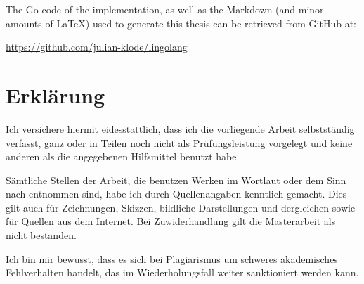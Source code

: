 \vskip1cm
The Go code of the implementation, as well as the Markdown (and minor amounts of \LaTeX) used to generate
this thesis can be retrieved from GitHub at:

\url{https://github.com/julian-klode/lingolang}


\chapter*{Erklärung}
\begin{otherlanguage}{ngerman}
Ich versichere hiermit eidesstattlich, dass ich die vorliegende Arbeit
selbstständig verfasst, ganz oder in Teilen noch nicht als
Prüfungsleistung vorgelegt und keine anderen als die angegebenen
Hilfsmittel benutzt habe.

Sämtliche Stellen der Arbeit, die benutzen Werken im Wortlaut oder dem
Sinn nach entnommen sind, habe ich durch Quellenangaben kenntlich
gemacht. Dies gilt auch für Zeichnungen, Skizzen, bildliche
Darstellungen und dergleichen sowie für Quellen aus dem Internet. Bei
Zuwiderhandlung gilt die Masterarbeit als nicht bestanden.

Ich bin mir bewusst, dass es sich bei Plagiarismus um schweres
akademisches Fehlverhalten handelt, das im Wiederholungsfall weiter
sanktioniert werden kann.

{
    \vskip3cm
    \par\noindent\makebox[7cm]{\hrulefill} \hfill\makebox[7cm]{\hrulefill}
    \par\noindent{}      \hfill{}
}
\end{otherlanguage}

